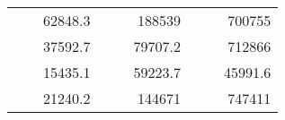 \begin{table}[H]
\begin{tabular}{|ccrccrccc}
\rowcolor[HTML]{DDFDFF} 
\multicolumn{1}{|c|}{\cellcolor[HTML]{FFFFC7}}                                & \multicolumn{1}{c|}{\cellcolor[HTML]{DDFDFF}}                      & \multicolumn{1}{r|}{\cellcolor[HTML]{DAE8FC}62848.3}   & \multicolumn{1}{c|}{\cellcolor[HTML]{FFFFC7}}                                & \multicolumn{1}{c|}{\cellcolor[HTML]{DDFDFF}}                       & \multicolumn{1}{r|}{\cellcolor[HTML]{DDFDFF}188539}    & \multicolumn{1}{c|}{\cellcolor[HTML]{FFFFC7}}                                & \multicolumn{1}{c|}{\cellcolor[HTML]{DDFDFF}}                      & \multicolumn{1}{r|}{\cellcolor[HTML]{DDFDFF}700755}    \\ \cline{3-3} \cline{6-6} \cline{9-9} 
\multicolumn{1}{|c|}{\cellcolor[HTML]{FFFFC7}}                                & \multicolumn{1}{c|}{\cellcolor[HTML]{DDFDFF}}                      & \multicolumn{1}{r|}{\cellcolor[HTML]{DDFDFF}37592.7}   & \multicolumn{1}{c|}{\cellcolor[HTML]{FFFFC7}}                                & \multicolumn{1}{c|}{\cellcolor[HTML]{DDFDFF}}                       & \multicolumn{1}{r|}{\cellcolor[HTML]{DAE8FC}79707.2}   & \multicolumn{1}{c|}{\cellcolor[HTML]{FFFFC7}}                                & \multicolumn{1}{c|}{\cellcolor[HTML]{DDFDFF}}                      & \multicolumn{1}{r|}{\cellcolor[HTML]{DAE8FC}712866}    \\ \cline{3-3} \cline{6-6} \cline{9-9} 
\rowcolor[HTML]{DDFDFF} 
\multicolumn{1}{|c|}{\cellcolor[HTML]{FFFFC7}}                                & \multicolumn{1}{c|}{\cellcolor[HTML]{DDFDFF}}                      & \multicolumn{1}{r|}{\cellcolor[HTML]{DAE8FC}15435.1}   & \multicolumn{1}{c|}{\cellcolor[HTML]{FFFFC7}}                                & \multicolumn{1}{c|}{\cellcolor[HTML]{DDFDFF}}                       & \multicolumn{1}{r|}{\cellcolor[HTML]{DDFDFF}59223.7}   & \multicolumn{1}{c|}{\cellcolor[HTML]{FFFFC7}}                                & \multicolumn{1}{c|}{\cellcolor[HTML]{DDFDFF}}                      & \multicolumn{1}{r|}{\cellcolor[HTML]{DDFDFF}45991.6}   \\ \cline{3-3} \cline{6-6} \cline{9-9} 
\multicolumn{1}{|c|}{\cellcolor[HTML]{FFFFC7}}                                & \multicolumn{1}{c|}{\cellcolor[HTML]{DDFDFF}}                      & \multicolumn{1}{r|}{\cellcolor[HTML]{DDFDFF}21240.2}   & \multicolumn{1}{c|}{\cellcolor[HTML]{FFFFC7}}                                & \multicolumn{1}{c|}{\cellcolor[HTML]{DDFDFF}}                       & \multicolumn{1}{r|}{\cellcolor[HTML]{DAE8FC}144671}    & \multicolumn{1}{c|}{\cellcolor[HTML]{FFFFC7}}                                & \multicolumn{1}{c|}{\cellcolor[HTML]{DDFDFF}}                      & \multicolumn{1}{r|}{\cellcolor[HTML]{DAE8FC}747411}    \\ \cline{3-3} \cline{6-6} \cline{9-9} 

\end{tabular}
\end{table}
